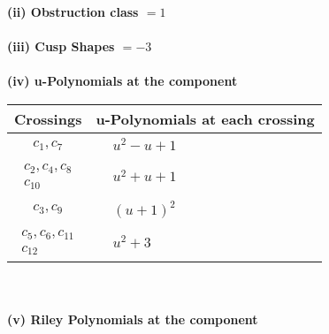\documentclass[1p]{elsarticle_modified}
\theoremstyle{definition}
\begin{document}
\flushleft \textbf{(ii) Obstruction class $= 1$}\\~\\
\flushleft \textbf{(iii) Cusp Shapes $= -3$}\\~\\
\newpage\renewcommand{\arraystretch}{1}
\flushleft \textbf{(iv) u-Polynomials at the component}\newline \\
\begin{tabular}{m{50pt}|m{274pt}}
Crossings & \hspace{64pt}u-Polynomials at each crossing \\
\hline $$\begin{aligned}c_{1},c_{7}\end{aligned}$$&$\begin{aligned}
&u^2- u+1
\end{aligned}$\\
\hline $$\begin{aligned}c_{2},c_{4},c_{8}\\c_{10}\end{aligned}$$&$\begin{aligned}
&u^2+u+1
\end{aligned}$\\
\hline $$\begin{aligned}c_{3},c_{9}\end{aligned}$$&$\begin{aligned}
&(u+1)^2
\end{aligned}$\\
\hline $$\begin{aligned}c_{5},c_{6},c_{11}\\c_{12}\end{aligned}$$&$\begin{aligned}
&u^2+3
\end{aligned}$\\
\hline
\end{tabular}\\~\\
\newpage\renewcommand{\arraystretch}{1}
\flushleft \textbf{(v) Riley Polynomials at the component}\newline \\
\end{document}
